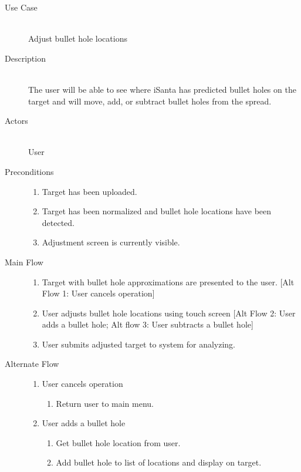 \begin{description}
    \item[Use Case] \hfill \\
        Adjust bullet hole locations
    \item[Description] \hfill \\
        The user will be able to see where iSanta has predicted bullet holes on the target and will move, add, or subtract bullet holes from the spread.
    \item[Actors] \hfill \\
        User
    \item[Preconditions] \hfill 
        \begin{enumerate}
            \item Target has been uploaded.
            \item Target has been normalized and bullet hole locations have been detected.
            \item Adjustment screen is currently visible.
        \end{enumerate}
    \item[Main Flow] \hfill 
        \begin{enumerate}
            \item Target with bullet hole approximations are presented to the user.
                [Alt Flow 1: User cancels operation]
            \item User adjusts bullet hole locations using touch screen 
                [Alt Flow 2: User adds a bullet hole; 
                Alt flow 3: User subtracts a bullet hole]
            \item User submits adjusted target to system for analyzing. 
        \end{enumerate}
    \item[Alternate Flow] \hfill 
        \begin{enumerate}
            \item User cancels operation 
                \begin{enumerate}
                    \item Return user to main menu. 
                \end{enumerate}
            \item User adds a bullet hole
                \begin{enumerate}
                    \item Get bullet hole location from user.
                    \item Add bullet hole to list of locations and display on target.

\end{enumerate}
\end{enumerate}
\end{description}

